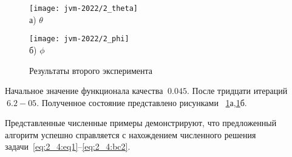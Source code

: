 \begin{figure}[ht]
    \begin{minipage}[b][][b]{0.49\linewidth}
        \centering
        \texttt{[image: jvm-2022/2\_theta]}
        \\ а) $\theta$
    \end{minipage}
    \hfill
    \begin{minipage}[b][][b]{0.49\linewidth}
        \centering
        \texttt{[image: jvm-2022/2\_phi]}
        \\ б) $\phi$
    \end{minipage}
    \caption{Результаты второго эксперимента}
    \label{fig:4_4:6}
\end{figure}
Начальное значение функционала качества $~0.045$.
После тридцати итераций $~6.2-05$.
Полученное состояние представлено рисунками ~\ref{fig:4_4:6}а,\ref{fig:4_4:6}б.


Представленные численные примеры демонстрируют,
что предложенный алгоритм успешно справляется
с нахождением численного решения задачи~\eqref{eq:2_4:eq1}--\eqref{eq:2_4:bc2}.

